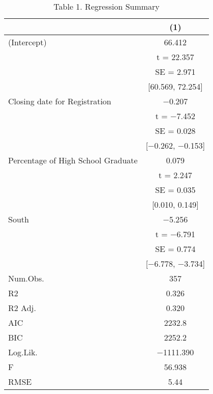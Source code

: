 \documentclass[
  letterpaper,
  DIV=11,
  numbers=noendperiod]{scrartcl}
\begin{document}
\begin{table}

\caption{Table 1. Regression Summary}
\centering
\begin{tabular}[t]{lc}
\toprule
  & (1)\\
\midrule
(Intercept) & \num{66.412}\\
 & t = \num{22.357}\\
 & SE = \num{2.971}\\
 & {}[\num{60.569}, \num{72.254}]\\
Closing date for Registration & \num{-0.207}\\
 & t = \num{-7.452}\\
 & SE = \num{0.028}\\
 & {}[\num{-0.262}, \num{-0.153}]\\
Percentage of High School Graduate & \num{0.079}\\
 & t = \num{2.247}\\
 & SE = \num{0.035}\\
 & {}[\num{0.010}, \num{0.149}]\\
South & \num{-5.256}\\
 & t = \num{-6.791}\\
 & SE = \num{0.774}\\
 & {}[\num{-6.778}, \num{-3.734}]\\
\midrule
Num.Obs. & \num{357}\\
R2 & \num{0.326}\\
R2 Adj. & \num{0.320}\\
AIC & \num{2232.8}\\
BIC & \num{2252.2}\\
Log.Lik. & \num{-1111.390}\\
F & \num{56.938}\\
RMSE & \num{5.44}\\
\bottomrule
\end{tabular}
\end{table}
\end{document}
